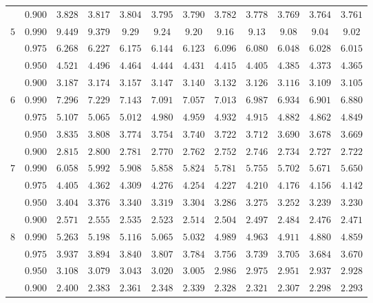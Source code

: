\documentclass[11pt]{article}
\theoremstyle{definition}
\begin{document}
\begin{table}[H]
\begin{tabularx}{\linewidth}{c | c | c c c c c c c c c c}
		& $0.900$ & $3.828$ & $3.817$ & $3.804$ & $3.795$ & $3.790$ & $3.782$ & $3.778$ & $3.769$ & $3.764$ & $3.761$ \\
		$5$ & $0.990$ & $9.449$ & $9.379$ & $9.29$ & $9.24$ & $9.20$ & $9.16$ & $9.13$ & $9.08$ & $9.04$ & $9.02$ \\
		& $0.975$ & $6.268$ & $6.227$ & $6.175$ & $6.144$ & $6.123$ & $6.096$ & $6.080$ & $6.048$ & $6.028$ & $6.015$ \\
		& $0.950$ & $4.521$ & $4.496$ & $4.464$ & $4.444$ & $4.431$ & $4.415$ & $4.405$ & $4.385$ & $4.373$ & $4.365$ \\
		& $0.900$ & $3.187$ & $3.174$ & $3.157$ & $3.147$ & $3.140$ & $3.132$ & $3.126$ & $3.116$ & $3.109$ & $3.105$ \\
		$6$ & $0.990$ & $7.296$ & $7.229$ & $7.143$ & $7.091$ & $7.057$ & $7.013$ & $6.987$ & $6.934$ & $6.901$ & $6.880$ \\
		& $0.975$ & $5.107$ & $5.065$ & $5.012$ & $4.980$ & $4.959$ & $4.932$ & $4.915$ & $4.882$ & $4.862$ & $4.849$ \\
		& $0.950$ & $3.835$ & $3.808$ & $3.774$ & $3.754$ & $3.740$ & $3.722$ & $3.712$ & $3.690$ & $3.678$ & $3.669$ \\
		& $0.900$ & $2.815$ & $2.800$ & $2.781$ & $2.770$ & $2.762$ & $2.752$ & $2.746$ & $2.734$ & $2.727$ & $2.722$ \\
		$7$ & $0.990$ & $6.058$ & $5.992$ & $5.908$ & $5.858$ & $5.824$ & $5.781$ & $5.755$ & $5.702$ & $5.671$ & $5.650$ \\
		& $0.975$ & $4.405$ & $4.362$ & $4.309$ & $4.276$ & $4.254$ & $4.227$ & $4.210$ & $4.176$ & $4.156$ & $4.142$ \\
		& $0.950$ & $3.404$ & $3.376$ & $3.340$ & $3.319$ & $3.304$ & $3.286$ & $3.275$ & $3.252$ & $3.239$ & $3.230$ \\
		& $0.900$ & $2.571$ & $2.555$ & $2.535$ & $2.523$ & $2.514$ & $2.504$ & $2.497$ & $2.484$ & $2.476$ & $2.471$ \\
		$8$ & $0.990$ & $5.263$ & $5.198$ & $5.116$ & $5.065$ & $5.032$ & $4.989$ & $4.963$ & $4.911$ & $4.880$ & $4.859$ \\
		& $0.975$ & $3.937$ & $3.894$ & $3.840$ & $3.807$ & $3.784$ & $3.756$ & $3.739$ & $3.705$ & $3.684$ & $3.670$ \\
		& $0.950$ & $3.108$ & $3.079$ & $3.043$ & $3.020$ & $3.005$ & $2.986$ & $2.975$ & $2.951$ & $2.937$ & $2.928$ \\
		& $0.900$ & $2.400$ & $2.383$ & $2.361$ & $2.348$ & $2.339$ & $2.328$ & $2.321$ & $2.307$ & $2.298$ & $2.293$ \\

\end{tabularx}
\end{table}
\end{document}
